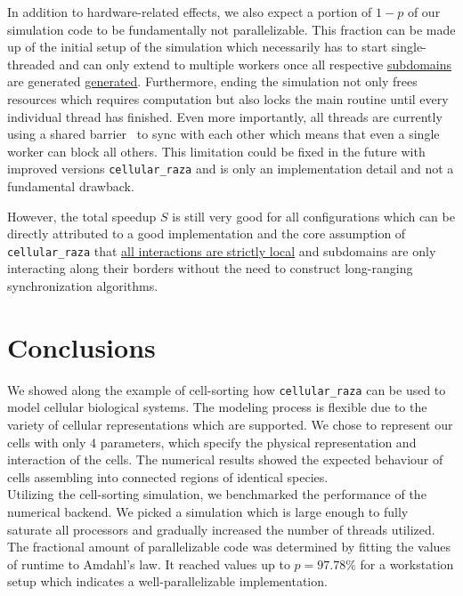 \documentclass[fontsize=11pt,a4paper]{article}
\begin{document}
In addition to hardware-related effects, we also expect a portion of $1-p$ of our simulation code
to be fundamentally not parallelizable.
This fraction can be made up of the initial setup of the simulation which necessarily has to start
single-threaded and can only extend to multiple workers once all respective
\href{https://cellular-raza.com/docs/cellular_raza_core/backend/chili/struct.SubDomainBox.html}
{subdomains} are generated
\href{https://cellular-raza.com/docs/cellular_raza_concepts/trait.Domain.html}{generated}.
Furthermore, ending the simulation not only frees resources which requires computation but also
locks the main routine until every individual thread has finished.
Even more importantly, all threads are currently using a shared barrier~\cite{GjengsetHurdles2018}
to sync with each other which means that even a single worker can block all others.
This limitation could be fixed in the future with improved versions \texttt{cellular\_raza} and is
only an implementation detail and not a fundamental drawback.

However, the total speedup $S$ is still very good for all configurations which can be directly
attributed to a good implementation and the core assumption of \texttt{cellular\_raza} that
\href{https://cellular-raza.com/guides/introduction/#local-rules}
{all interactions are strictly local} and subdomains are only interacting along their borders
without the need to construct long-ranging synchronization algorithms.

\section{Conclusions}\label{conclusions}

We showed along the example of cell-sorting how \texttt{cellular\_raza} can be used to model
cellular biological systems.
The modeling process is flexible due to the variety of cellular representations which are supported.
We chose to represent our cells with only 4 parameters, which specify the physical representation
and interaction of the cells.
The numerical results showed the expected behaviour of cells assembling into connected regions of
identical species.\\
Utilizing the cell-sorting simulation, we benchmarked the performance of the numerical backend.
We picked a simulation which is large enough to fully saturate all processors and gradually
increased the number of threads utilized.
The fractional amount of parallelizable code was determined by fitting the values of runtime to
Amdahl's law.
It reached values up to $p=97.78\%$ for a workstation setup which indicates a well-parallelizable
implementation.
\end{document}
